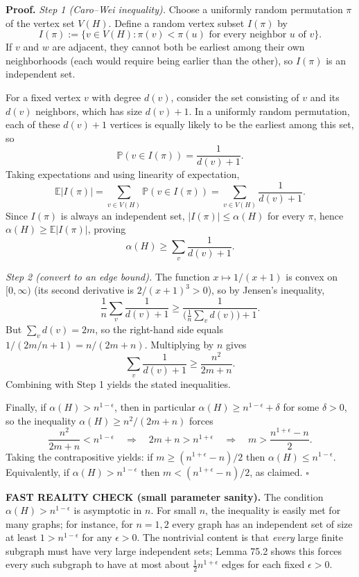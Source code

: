 \noindent\textbf{Proof.}
\emph{Step 1 (Caro--Wei inequality).}
Choose a uniformly random permutation $\pi$ of the vertex set $V(H)$. Define a random vertex subset $I(\pi)$ by
\[
I(\pi):=\{v\in V(H): \pi(v)<\pi(u)\text{ for every neighbor }u\text{ of }v\}.
\]
If $v$ and $w$ are adjacent, they cannot both be earliest among their own neighborhoods (each would require being earlier than the other), so $I(\pi)$ is an independent set.

For a fixed vertex $v$ with degree $d(v)$, consider the set consisting of $v$ and its $d(v)$ neighbors, which has size $d(v)+1$. In a uniformly random permutation, each of these $d(v)+1$ vertices is equally likely to be the earliest among this set, so
\[
\mathbb P(v\in I(\pi))=\frac{1}{d(v)+1}.
\]
Taking expectations and using linearity of expectation,
\[
\mathbb E\lvert I(\pi)\rvert = \sum_{v\in V(H)} \mathbb P(v\in I(\pi)) = \sum_{v\in V(H)}\frac{1}{d(v)+1}.
\]
Since $I(\pi)$ is always an independent set, $\lvert I(\pi)\rvert\le \alpha(H)$ for every $\pi$, hence $\alpha(H)\ge \mathbb E\lvert I(\pi)\rvert$, proving
\[\alpha(H)\ge \sum_v \frac{1}{d(v)+1}.
\]

\emph{Step 2 (convert to an edge bound).}
The function $x\mapsto 1/(x+1)$ is convex on $[0,\infty)$ (its second derivative is $2/(x+1)^3>0$), so by Jensen's inequality,
\[
\frac{1}{n}\sum_{v}\frac{1}{d(v)+1}\ge \frac{1}{\big(\frac{1}{n}\sum_v d(v)\big)+1}.
\]
But $\sum_v d(v)=2m$, so the right-hand side equals $1/(2m/n+1)=n/(2m+n)$. Multiplying by $n$ gives
\[
\sum_v \frac{1}{d(v)+1}\ge \frac{n^2}{2m+n}.
\]
Combining with Step 1 yields the stated inequalities.

Finally, if $\alpha(H)>n^{1-\epsilon}$, then in particular $\alpha(H)\ge n^{1-\epsilon}+\delta$ for some $\delta>0$, so the inequality $\alpha(H)\ge n^2/(2m+n)$ forces
\[
\frac{n^2}{2m+n}< n^{1-\epsilon} \quad\Longrightarrow\quad 2m+n> n^{1+\epsilon}\quad\Longrightarrow\quad m>\frac{n^{1+\epsilon}-n}{2}.
\]
Taking the contrapositive yields: if $m\ge (n^{1+\epsilon}-n)/2$ then $\alpha(H)\le n^{1-\epsilon}$. Equivalently, if $\alpha(H)>n^{1-\epsilon}$ then $m< (n^{1+\epsilon}-n)/2$, as claimed.
\hfill$\square$

\medskip
\noindent\textbf{FAST REALITY CHECK (small parameter sanity).}
The condition $\alpha(H)>n^{1-\epsilon}$ is asymptotic in $n$. For small $n$, the inequality is easily met for many graphs; for instance, for $n=1,2$ every graph has an independent set of size at least $1>n^{1-\epsilon}$ for any $\epsilon>0$. The nontrivial content is that \emph{every} large finite subgraph must have very large independent sets; Lemma 75.2 shows this forces every such subgraph to have at most about $\frac12 n^{1+\epsilon}$ edges for each fixed $\epsilon>0$.

